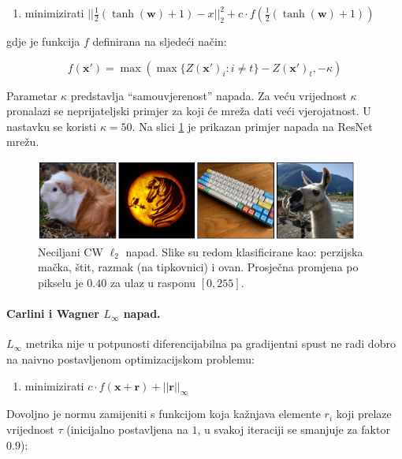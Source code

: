 \documentclass[utf8, diplomski]{fer}
\begin{document}
\begin{enumerate}[noitemsep, label=\textbullet]
  \item minimizirati $||\frac{1}{2}(\tanh(\boldsymbol{w}) + 1) - x||_{2}^{2} + c \cdot f(\frac{1}{2}(\tanh(\boldsymbol{w}) + 1))$
\end{enumerate}

gdje je funkcija $f$ definirana na sljedeći način:

\begin{equation}
f(\boldsymbol{x}') = \max(\max\{Z(\boldsymbol{x}')_{i} : i \neq t\} - Z(\boldsymbol{x}')_{t}, -\kappa)
\end{equation}

Parametar $\kappa$ predstavlja ``samouvjerenost'' napada. Za veću vrijednost $\kappa$ pronalazi se neprijateljski primjer za koji će mreža dati veći vjerojatnost. U nastavku se koristi $\kappa = 50$. Na slici \ref{fig:carlini_l2} je prikazan primjer napada na ResNet mrežu.

\begin{figure}[H]
\centering
\includegraphics[width=0.95\textwidth,keepaspectratio]{img/results/carlini_l2.png}
\caption{Neciljani CW $\ell_{2}$ napad. Slike su redom klasificirane kao: perzijska mačka, štit, razmak (na tipkovnici) i ovan. Prosječna promjena po pikselu je $0.40$ za ulaz u rasponu $[0, 255]$.}
\label{fig:carlini_l2}
\end{figure}


\paragraph{Carlini i Wagner $L_{\infty}$ napad.} 
$L_{\infty}$ metrika nije u potpunosti diferencijabilna pa gradijentni spust ne radi dobro na naivno postavljenom optimizacijskom problemu:

\begin{enumerate}[noitemsep, label=\textbullet]
  \item minimizirati $c \cdot f(\boldsymbol{x} + \boldsymbol{r}) + ||\boldsymbol{r}||_{\infty}$
\end{enumerate}

Dovoljno je normu zamijeniti s funkcijom koja kažnjava elemente $r_{i}$ koji prelaze vrijednost $\tau$ (inicijalno postavljena na $1$, u svakoj iteraciji se smanjuje za faktor $0.9$):
\end{document}
